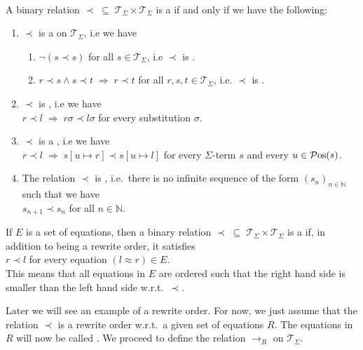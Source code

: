 \begin{Definition} \hspace*{\fill} \\
  A binary relation $\prec \;\subseteq\; \mathcal{T}_\Sigma \times \mathcal{T}_\Sigma$ is a
   if and only if we have the following:
  \begin{enumerate}
  \item $\prec$ is a  on $\mathcal{T}_\Sigma$, i.e we have
        \begin{enumerate}
        \item $\neg (s \prec s)$ \hspace*{2.6cm} for all $s \in \mathcal{T}_\Sigma$, i.e $\prec$ is .
        \item $r \prec s \wedge s \prec t \;\Rightarrow\; r \prec t$ \quad for all $r,s,t \in \mathcal{T}_\Sigma$,
              i.e. $\prec$ is . 
        \end{enumerate}
    
  \item $\prec$ is , i.e we have
        \\[0.2cm]
        \hspace*{1.3cm}
        $r \prec l \;\Rightarrow\; r\sigma \prec l\sigma$ \quad for every substitution $\sigma$.
  \item $\prec$ is a , i.e we have
        \\[0.2cm]
        \hspace*{1.3cm}
        $r \prec l \;\Rightarrow\; s[u \mapsto r] \prec s[u \mapsto l]$ for every $\Sigma$-term $s$ and every
        $u \in\mathcal{P}\mathrm{os}(s)  $.
  \item The relation $\prec$ is , i.e.~there is no infinite sequence of the form
        $(s_n)_{n\in\mathbb{N}}$ such that we have
        \\[0.2cm]
        \hspace*{1.3cm}
        $s_{n+1} \prec s_n$ \quad for all $n \in \mathbb{N}$. 
  \end{enumerate}
  If $E$ is a set of equations, then a binary relation $\prec \;\subseteq\; \mathcal{T}_\Sigma \times \mathcal{T}_\Sigma$
  is a  if, in addition to being a rewrite order, it satisfies
  \\[0.2cm]
  \hspace*{1.3cm}
  $r \prec l$ \quad for every equation $(l \approx r) \in E$.
  \\[0.2cm]    
  This means that all equations in $E$ are ordered such that the right hand side is smaller than the left
  hand side w.r.t.~$\prec$.    \eod
\end{Definition}
Later we will see an example of a rewrite order.  For now, we just assume that 
the relation $\prec$ is a rewrite order w.r.t.~a given set of equations $R$.  The equations in $R$ will now be called
.  We proceed to define the relation $\rightarrow_R$ on $\mathcal{T}_\Sigma$.

